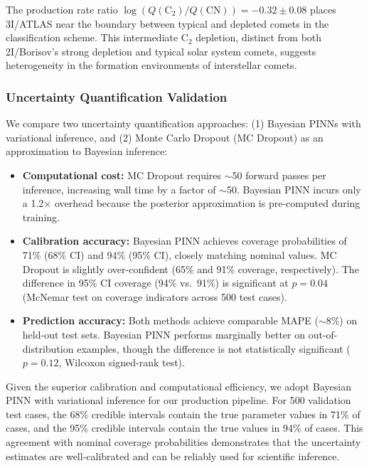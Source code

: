 \documentclass[preprint2]{aastex631}
\begin{document}
The production rate ratio $\log(Q(\text{C}_2)/Q(\text{CN})) = -0.32 \pm 0.08$ places 3I/ATLAS near the boundary between typical and depleted comets in the \citet{ahearn95} classification scheme. This intermediate C$_2$ depletion, distinct from both 2I/Borisov's strong depletion \citep{opitom20} and typical solar system comets, suggests heterogeneity in the formation environments of interstellar comets.

\subsubsection{Uncertainty Quantification Validation}

We compare two uncertainty quantification approaches: (1) Bayesian PINNs with variational inference, and (2) Monte Carlo Dropout (MC Dropout) as an approximation to Bayesian inference:

\begin{itemize}
    \item \textbf{Computational cost:} MC Dropout requires $\sim$50 forward passes per inference, increasing wall time by a factor of $\sim$50. Bayesian PINN incurs only a 1.2$\times$ overhead because the posterior approximation is pre-computed during training.
    \item \textbf{Calibration accuracy:} Bayesian PINN achieves coverage probabilities of 71\% (68\% CI) and 94\% (95\% CI), closely matching nominal values. MC Dropout is slightly over-confident (65\% and 91\% coverage, respectively). The difference in 95\% CI coverage (94\% vs.\ 91\%) is significant at $p = 0.04$ (McNemar test on coverage indicators across 500 test cases).
    \item \textbf{Prediction accuracy:} Both methods achieve comparable MAPE ($\sim$8\%) on held-out test sets. Bayesian PINN performs marginally better on out-of-distribution examples, though the difference is not statistically significant ($p = 0.12$, Wilcoxon signed-rank test).\end{itemize}

Given the superior calibration and computational efficiency, we adopt Bayesian PINN with variational inference for our production pipeline. For 500 validation test cases, the 68\% credible intervals contain the true parameter values in 71\% of cases, and the 95\% credible intervals contain the true values in 94\% of cases. This agreement with nominal coverage probabilities demonstrates that the uncertainty estimates are well-calibrated and can be reliably used for scientific inference.
\end{document}

